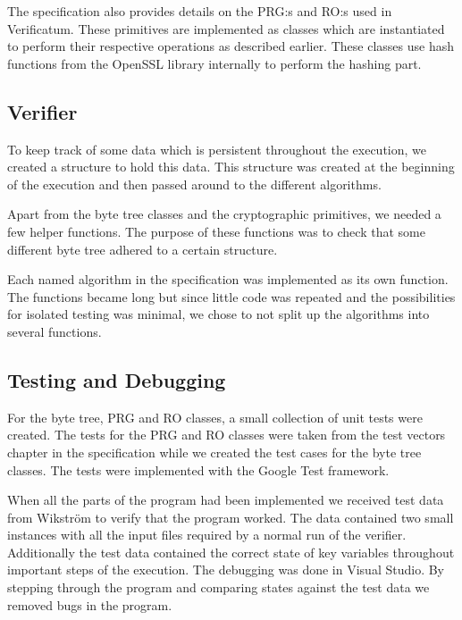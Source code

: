 The specification also provides details on the PRG:s and RO:s used in
Verificatum. These primitives are implemented as classes which are
instantiated to perform their respective operations as described
earlier. These classes use hash functions from the OpenSSL library
internally to perform the hashing part.

\subsection{Verifier}

To keep track of some data which is persistent throughout the
execution, we created a structure to hold this data. This structure
was created at the beginning of the execution and then passed around
to the different algorithms.

Apart from the byte tree classes and the cryptographic primitives, we
needed a few helper functions. The purpose of these functions was to
check that some different byte tree adhered to a certain structure.

Each named algorithm in the specification was implemented as its own
function. The functions became long but since little code was repeated
and the possibilities for isolated testing was minimal, we chose to
not split up the algorithms into several functions.

\subsection{Testing and Debugging}

For the byte tree, PRG and RO classes, a small collection of unit
tests were created. The tests for the PRG and RO classes were taken
from the test vectors chapter in the specification while we created
the test cases for the byte tree classes. The tests were implemented
with the Google Test framework.

When all the parts of the program had been implemented we received
test data from Wikström to verify that the program worked. The data
contained two small instances with all the input files required by a
normal run of the verifier. Additionally the test data contained the
correct state of key variables throughout important steps of the
execution. The debugging was done in Visual Studio. By stepping
through the program and comparing states against the test data we
removed bugs in the program.
